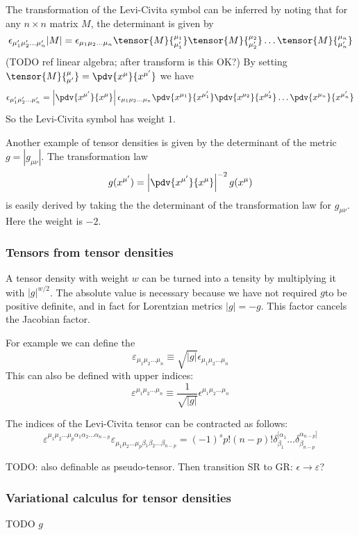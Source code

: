 The transformation of the Levi-Civita symbol can be inferred by noting that for any $n\times n$ matrix $M$, the determinant is given by
\[ \epsilon_{\mu'_1\mu'_2\ldots \mu'_n}|M| = \epsilon_{\mu_1\mu_2 \ldots \mu_n}\tensor{M}{^{\mu_1}_{\mu'_1}}\tensor{M}{^{\mu_2}_{\mu'_2}}\ldots \tensor{M}{^{\mu_n}_{\mu'_n}} \]
(TODO ref linear algebra; after transform is this OK?) By setting $\tensor{M}{^{\mu}_{\mu'}} = \pdv{x^\mu}{x^{\mu'}}$ we have
\[ \epsilon_{\mu'_1\mu'_2\ldots\mu'_n} = \left|\pdv{x^{\mu'}}{x^\mu}\right|\epsilon_{\mu_1\mu_2\ldots\mu_n}\pdv{x^{\mu_1}}{x^{\mu'_1}}\pdv{x^{\mu_2}}{x^{\mu'_2}}\ldots \pdv{x^{\mu_n}}{x^{\mu'_n}} \]
So the Levi-Civita symbol has weight $1$.

Another example of tensor densities is given by the determinant of the metric $g = |g_{\mu\nu}|$. The transformation law
\[g(x^{\mu'}) = \left|\pdv{x^{\mu'}}{x^\mu}\right|^{-2} g(x^\mu)\]
is easily derived by taking the the determinant of the transformation law for $g_{\mu\nu}$. Here the weight is $-2$.

\subsubsection{Tensors from tensor densities}
A tensor density with weight $w$ can be turned into a tensity by multiplying it with $|g|^{w/2}$. The absolute value is necessary because we have not required $g$to be positive definite, and in fact for Lorentzian metrics $|g| = -g$. This factor cancels the Jacobian factor.

For example we can define the 
\[ \varepsilon_{\mu_1\mu_2\ldots\mu_n} \equiv \sqrt{|g|}\epsilon_{\mu_1\mu_2\ldots\mu_n} \]
This can also be defined with upper indices:
\[ \varepsilon^{\mu_1\mu_2\ldots\mu_n} \equiv \frac{1}{\sqrt{|g|}}\epsilon^{\mu_1\mu_2\ldots\mu_n} \]

The indices of the Levi-Civita tensor can be contracted as follows:
\[ \varepsilon^{\mu_1\mu_2\ldots\mu_p\alpha_1\alpha_2\ldots\alpha_{n-p}}\varepsilon_{\mu_1\mu_2\ldots\mu_p\beta_1\beta_2\ldots\beta_{n-p}} = (-1)^sp!(n-p)!\delta_{\beta_1}^{[\alpha_1}\ldots\delta_{\beta_{n-p}}^{\alpha_{n-p}]} \]

TODO: also definable as pseudo-tensor. Then transition SR to GR: $\epsilon \to \varepsilon$?

\subsubsection{Variational calculus for tensor densities}
TODO $g$

